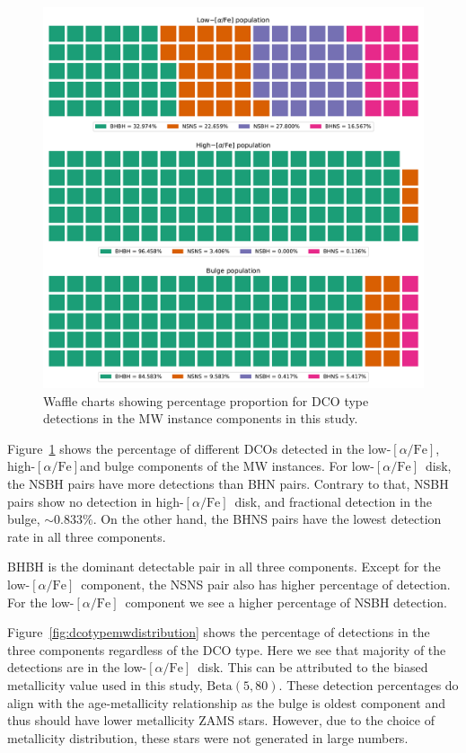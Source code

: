 \documentclass[journal, twocolumns]{IEEEtran}
\newcommand{\lowalpha}{low-$[\alpha/\text{Fe}]$}
\newcommand{\highalpha}{high-$[\alpha/\text{Fe}]$}
\begin{document}
    \begin{figure}[!h]%
		\centering
        \includegraphics[width=\columnwidth]{analysis_data/004__images_for_latex/dco_type_MW_component_distribution}
		\caption{Waffle charts showing percentage proportion for DCO type detections in the MW instance components in this study.}
		\label{fig:dcotypemwcomponentdistributioncropped}
	\end{figure}%

    Figure~\ref{fig:dcotypemwcomponentdistributioncropped} shows the percentage of different DCOs detected in the \lowalpha, \highalpha and bulge components of the MW instances.
    For \lowalpha\ disk, the NSBH pairs have more detections than BHN pairs.
	Contrary to that, NSBH pairs show no detection in \highalpha\ disk, and fractional detection in the bulge, $\sim0.833\%$.
	On the other hand, the BHNS pairs have the lowest detection rate in all three components.
	
	BHBH is the dominant detectable pair in all three components. 
	Except for the \lowalpha\ component, the NSNS pair also has higher percentage of detection. 
	For the \lowalpha\ component we see a higher percentage of NSBH detection.

    Figure~\ref{fig:dcotypemwdistribution} shows the percentage of detections in the three components regardless of the DCO type.
    Here we see that majority of the detections are in the \lowalpha\ disk.
    This can be attributed to the biased metallicity value used in this study, $\text{Beta}(5, 80)$.
    These detection percentages do align with the age-metallicity relationship as the bulge is oldest component and thus should have lower metallicity ZAMS stars.
    However, due to the choice of metallicity distribution, these stars were not generated in large numbers.
\end{document}
